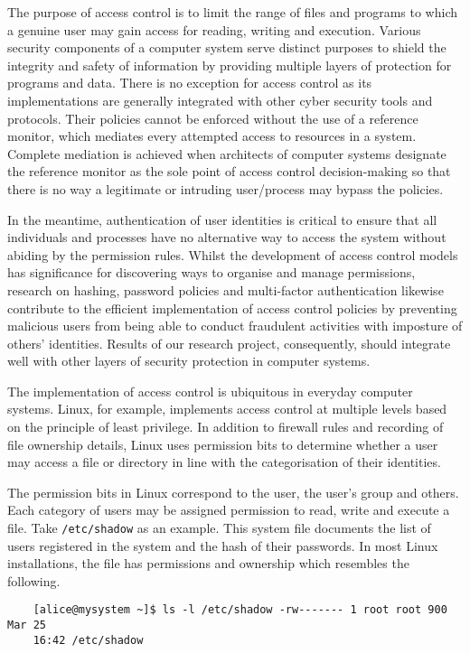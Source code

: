 \documentclass{article}
\begin{document}
The purpose of access control is to limit the range of files and
programs to which a genuine user may gain access for reading, writing and
execution. Various security components of a computer system serve distinct
purposes to shield the integrity and safety of information by providing
multiple layers of protection for programs and data. There is no exception
for access control as its implementations are generally integrated with other
cyber security tools and protocols. Their policies cannot be enforced without
the use of a reference monitor, which mediates every attempted access to
resources in a system.\cite{principles} Complete mediation is achieved when
architects of computer systems designate the reference monitor as the sole
point of access control decision-making so that there is no way a legitimate
or intruding user/process may bypass the policies.

In the meantime, authentication of user identities is critical to ensure
that all individuals and processes have no alternative way to access the
system without abiding by the permission rules. Whilst the development of
access control models has significance for discovering ways to organise and
manage permissions, research on hashing, password policies and multi-factor
authentication likewise contribute to the efficient implementation of access
control policies by preventing malicious users from being able to conduct
fraudulent activities with imposture of others' identities. Results of our
research project, consequently, should integrate well with other layers of
security protection in computer systems.

The implementation of access control is ubiquitous in everyday computer
systems. Linux, for example, implements access control at multiple levels
based on the principle of least privilege. In addition to firewall rules and
recording of file ownership details, Linux uses permission bits to determine
whether a user may access a file or directory in line with the categorisation
of their identities.

The permission bits in Linux correspond to the user, the user's group and
others. Each category of users may be assigned permission to read, write and
execute a file.\cite{access-control-assessment} Take \texttt{/etc/shadow}
as an example. This system file documents the list of users registered in
the system and the hash of their passwords. In most Linux installations,
the file has permissions and ownership which resembles the following.

\begin{verbatim}
    [alice@mysystem ~]$ ls -l /etc/shadow -rw------- 1 root root 900 Mar 25
    16:42 /etc/shadow
\end{verbatim}
\end{document}
